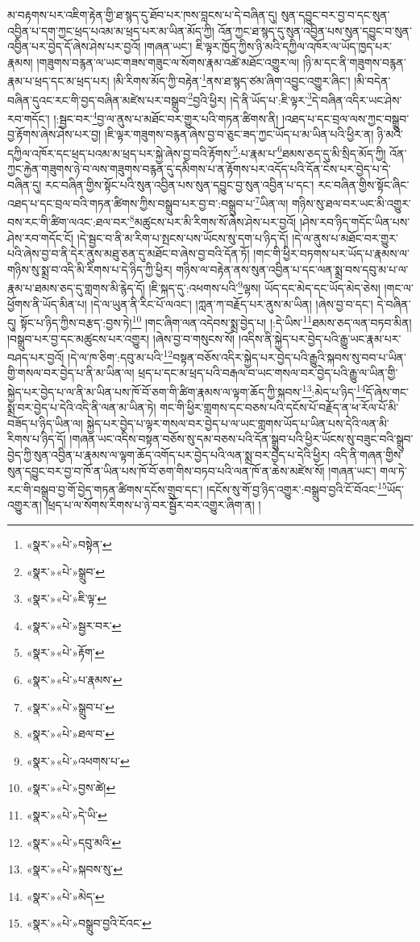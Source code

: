 མ་བརྟགས་པར་འཇིག་རྟེན་གྱི་ཐ་སྙད་དུ་ཐོབ་པར་ཁས་བླངས་པ་དེ་བཞིན་དུ། སུན་དབྱུང་བར་བྱ་བ་དང་སུན་འབྱིན་པ་དག་ཀྱང་ཕྲད་པའམ་མ་ཕྲད་པར་མ་ཡིན་མོད་ཀྱི། འོན་ཀྱང་ཐ་སྙད་དུ་སུན་འབྱིན་པས་སུན་དབྱུང་བ་སུན་འབྱིན་པར་བྱེད་དོ་ཞེས་ཤེས་པར་བྱའོ། །གཞན་ཡང་། ཇི་ལྟར་ཁྱོད་ཀྱིས་ཉི་མའི་དཀྱིལ་འཁོར་ལ་ཡོད་ཁྱད་པར་རྣམས། །གཟུགས་བརྙན་ལ་ཡང་གཟས་གཟུང་ལ་སོགས་རྣམ་འཚེ་མཐོང་འགྱུར་ལ། །ཉི་མ་དང་ནི་གཟུགས་བརྙན་རྣམ་པ་ཕྲད་དང་མ་ཕྲད་པར། །མི་རིགས་མོད་ཀྱི་བརྟེན་\footnote{«སྣར་»«པེ་»བསྟེན་}ནས་ཐ་སྙད་ཙམ་ཞིག་འབྱུང་འགྱུར་ཞིང་། །མི་བདེན་བཞིན་དུའང་རང་གི་བྱད་བཞིན་མཛེས་པར་བསྒྲུབ་\footnote{«སྣར་»«པེ་»སྒྲུབ་}བྱའི་ཕྱིར། །དེ་ནི་ཡོད་པ་:ཇི་ལྟར་\footnote{«སྣར་»«པེ་»ཇི་ལྟ་}དེ་བཞིན་འདིར་ཡང་ཤེས་རབ་གདོང་། །:སྦྱང་བར་\footnote{«སྣར་»«པེ་»སྦྱར་བར་}བྱ་ལ་ནུས་པ་མཐོང་བར་གྱུར་པའི་གཏན་ཚིགས་ནི། །འཐད་པ་དང་བྲལ་ལས་ཀྱང་བསྒྲུབ་བྱ་རྟོགས་ཞེས་ཤེས་པར་བྱ། །ཇི་ལྟར་གཟུགས་བརྙན་ཞེས་བྱ་བ་ཅུང་ཟད་ཀྱང་ཡོད་པ་མ་ཡིན་པའི་ཕྱིར་ན། ཉི་མའི་དཀྱིལ་འཁོར་དང་ཕྲད་པའམ་མ་ཕྲད་པར་སྐྱེ་ཞེས་བྱ་བའི་རྟོགས་\footnote{«སྣར་»«པེ་»རྟོག་}:པ་རྣམ་པ་\footnote{«སྣར་»«པེ་»པ་རྣམས་}ཐམས་ཅད་དུ་མི་སྲིད་མོད་ཀྱི། འོན་ཀྱང་རྐྱེན་གཟུགས་ཉེ་བ་ལས་གཟུགས་བརྙན་དུ་དམིགས་པ་ན་རྟོགས་པར་འདོད་པའི་དོན་ངེས་པར་བྱེད་པ་དེ་བཞིན་དུ། རང་བཞིན་གྱིས་སྟོང་པའི་སུན་འབྱིན་པས་སུན་དབྱུང་བྱ་སུན་འབྱིན་པ་དང་། རང་བཞིན་གྱིས་སྟོང་ཞིང་འཐད་པ་དང་བྲལ་བའི་གཏན་ཚིགས་ཀྱིས་བསྒྲུབ་པར་བྱ་བ་:བསྒྲུབ་པ་\footnote{«སྣར་»«པེ་»སྒྲུབ་པ་}ཡིན་ལ། གཉིས་སུ་ཐལ་བར་ཡང་མི་འགྱུར་བས་རང་གི་ཚིག་ལའང་:ཐལ་བར་\footnote{«སྣར་»«པེ་»ཐལ་བ་}མཚུངས་པར་མི་རིགས་སོ་ཞེས་ཤེས་པར་བྱའོ། །ཤེས་རབ་ཉིད་གདོང་ཡིན་པས་ཤེས་རབ་གདོང་ངོ། །དེ་སྦྱང་བ་ནི་མ་རིག་པ་སྤངས་པས་ཡོངས་སུ་དག་པ་ཉིད་དོ། །དེ་ལ་ནུས་པ་མཐོང་བར་གྱུར་པའི་ཞེས་བྱ་བ་ནི་དེར་ནུས་མཐུ་ཅན་དུ་མཐོང་བ་ཞེས་བྱ་བའི་དོན་ཏོ། །གང་གི་ཕྱིར་བཏགས་པར་ཡོད་པ་རྣམས་ལ་གཉིས་སུ་སྨྲ་བ་འདི་མི་རིགས་པ་དེ་ཉིད་ཀྱི་ཕྱིར། གཉིས་ལ་བརྟེན་ནས་སུན་འབྱིན་པ་དང་ལན་སྨྲ་བས་དབུ་མ་པ་ལ་རྣམ་པ་ཐམས་ཅད་དུ་གླགས་མི་རྙེད་དོ། །ཇི་སྐད་དུ་:འཕགས་པའི་\footnote{«སྣར་»«པེ་»འཕགས་པ་}ལྷས། ཡོད་དང་མེད་དང་ཡོད་མེད་ཅེས། །གང་ལ་ཕྱོགས་ནི་ཡོད་མིན་པ། །དེ་ལ་ཡུན་ནི་རིང་པོ་ལའང་། །ཀླན་ཀ་བརྗོད་པར་ནུས་མ་ཡིན། །ཞེས་བྱ་བ་དང་། དེ་བཞིན་དུ། སྟོང་པ་ཉིད་ཀྱིས་བརྩད་:བྱས་ཏེ།\footnote{«སྣར་»«པེ་»བྱས་ཚེ།} །གང་ཞིག་ལན་འདེབས་སྨྲ་བྱེད་པ། །:དེ་ཡིས་\footnote{«སྣར་»«པེ་»དེ་ཡི་}ཐམས་ཅད་ལན་བཏབ་མིན། །བསྒྲུབ་པར་བྱ་དང་མཚུངས་པར་འགྱུར། །ཞེས་བྱ་བ་གསུངས་སོ། །འདིས་ནི་སྐྱེད་པར་བྱེད་པའི་རྒྱུ་ཡང་རྣམ་པར་བཤད་པར་བྱའོ། །དེ་ལ་ཁ་ཅིག་:དབུ་མ་པའི་\footnote{«སྣར་»«པེ་»དབུ་མའི་}བསྟན་བཅོས་འདིར་སྐྱེད་པར་བྱེད་པའི་རྒྱུའི་སྐབས་སུ་བབ་པ་ཡིན་གྱི་གསལ་བར་བྱེད་པ་ནི་མ་ཡིན་ལ། ཕྲད་པ་དང་མ་ཕྲད་པའི་བརྒལ་བ་ཡང་གསལ་བར་བྱེད་པའི་རྒྱུ་ལ་ཡིན་གྱི་སྐྱེད་པར་བྱེད་པ་ལ་ནི་མ་ཡིན་པས་ཁོ་བོ་ཅག་གི་ཚིག་རྣམས་ལ་ལྟག་ཆོད་ཀྱི་སྐབས་\footnote{«སྣར་»«པེ་»སྐབས་སུ་}:མེད་པ་ཉིད་\footnote{«སྣར་»«པེ་»མེད་}དོ་ཞེས་གང་སྨྲ་བར་བྱེད་པ་དེའི་འདི་ནི་ལན་མ་ཡིན་ཏེ། གང་གི་ཕྱིར་གླགས་དང་བཅས་པའི་དངོས་པོ་བརྗོད་ན་ཕ་རོལ་པོ་མི་བཟོད་པ་ཉིད་ཡིན་ལ། སྐྱེད་པར་བྱེད་པ་ལྟར་གསལ་བར་བྱེད་པ་ལ་ཡང་གླགས་ཡོད་པ་ཡིན་པས་དེའི་ལན་མི་རིགས་པ་ཉིད་དོ། །གཞན་ཡང་འདིས་བསྟན་བཅོས་སུ་དམ་བཅས་པའི་དོན་སྒྲུབ་པའི་ཕྱིར་ཡོངས་སུ་བཟུང་བའི་སྒྲུབ་བྱེད་ཀྱི་སུན་འབྱིན་པ་རྣམས་ལ་ལྟག་ཆོད་འགོད་པར་བྱེད་པའི་ལན་སྨྲ་བར་བྱེད་པ་དེའི་ཕྱིར། འདི་ནི་གཞན་གྱིས་སུན་དབྱུང་བར་བྱ་བ་ཁོ་ན་ཡིན་པས་ཁོ་བོ་ཅག་གིས་བཏབ་པའི་ལན་ཁོ་ན་ཆེས་མཛེས་སོ། །གཞན་ཡང་། གལ་ཏེ་རང་གི་བསྒྲུབ་བྱ་གོ་བྱེད་གཏན་ཚིགས་དངོས་གྲུབ་དང་། །དངོས་སུ་གོ་བྱ་ཉིད་འགྱུར་:བསྒྲུབ་བྱའི་ངོ་བོའང་\footnote{«སྣར་»«པེ་»བསྒྲུབ་བྱའི་ངོའང་}ཡོད་འགྱུར་ན། །ཕྲད་པ་ལ་སོགས་རིགས་པ་ཉེ་བར་སྦྱོར་བར་འགྱུར་ཞིག་ན། །
